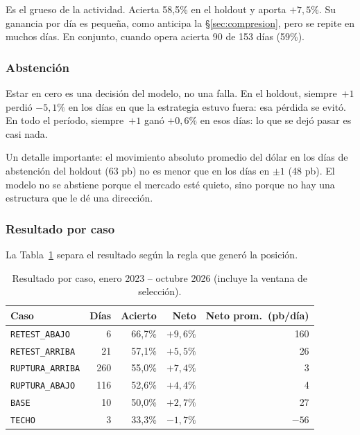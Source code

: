 \documentclass[10pt,a4paper]{article}
\begin{document}
Es el grueso de la actividad. Acierta 58,5\% en el holdout y aporta $+7{,}5\%$. Su
ganancia por día es pequeña, como anticipa la §\ref{sec:compresion}, pero se repite en
muchos días. En conjunto, cuando opera acierta 90 de 153 días (59\%).

\subsubsection{Abstención}

Estar en cero es una decisión del modelo, no una falla. En el holdout, siempre~$+1$
perdió $-5{,}1\%$ en los días en que la estrategia estuvo fuera: esa pérdida se evitó. En
todo el período, siempre~$+1$ ganó $+0{,}6\%$ en esos días: lo que se dejó pasar es casi
nada.

Un detalle importante: el movimiento absoluto promedio del dólar en los días de
abstención del holdout (63 pb) no es menor que en los días en $\pm1$ (48 pb). El modelo
no se abstiene porque el mercado esté quieto, sino porque no hay una estructura que le
dé una dirección.

\subsubsection{Resultado por caso}

La Tabla~\ref{tab:casos} separa el resultado según la regla que generó la posición.

\begin{table}[htb]\centering\small
\begin{tabular}{@{}lrrrr@{}}
\toprule
Caso & Días & Acierto & Neto & Neto prom.\ (pb/día) \\
\midrule
\texttt{RETEST\_ABAJO}   & 6   & 66{,}7\% & $+9{,}6\%$  & 160 \\
\texttt{RETEST\_ARRIBA}  & 21  & 57{,}1\% & $+5{,}5\%$  & 26 \\
\texttt{RUPTURA\_ARRIBA} & 260 & 55{,}0\% & $+7{,}4\%$  & 3 \\
\texttt{RUPTURA\_ABAJO}  & 116 & 52{,}6\% & $+4{,}4\%$  & 4 \\
\texttt{BASE}            & 10  & 50{,}0\% & $+2{,}7\%$  & 27 \\
\texttt{TECHO}           & 3   & 33{,}3\% & $-1{,}7\%$ & $-56$ \\
\bottomrule
\end{tabular}
\caption{Resultado por caso, enero 2023 -- octubre 2026 (incluye la ventana de
selección).}\label{tab:casos}
\end{table}
\end{document}
